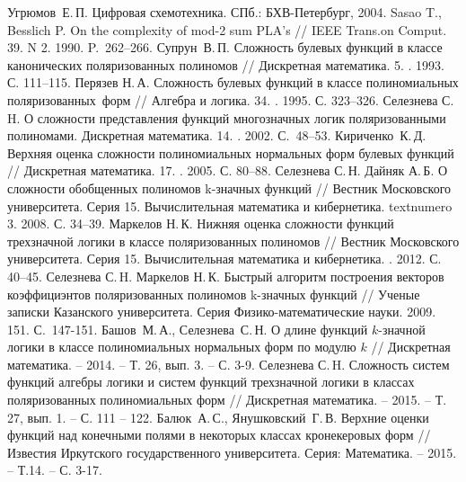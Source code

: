\documentclass [12pt, a4paper] {article}
\begin{document}
\begin{thebibliography}{0}
 Угрюмов~Е.\,П. Цифровая схемотехника. СПб.: БХВ-Петербург, 2004.
 Sasao T., Besslich P. On the complexity of mod-2 sum PLA’s  //
    IEEE Trans.on Comput. 39. N 2. 1990. P.~262--266.
 Супрун~В.\,П. Сложность булевых функций в классе канонических
    поляризованных полиномов // Дискретная математика. 5.
    . 1993. С. 111--115.
 Перязев Н.\,А. Сложность булевых функций в классе полиномиальных
    поляризованных~форм // Алгебра и логика. 34.
    . 1995. С. 323--326.
 Селезнева С.\,H. О сложности представления функций многозначных
    логик поляризованными полиномами. Дискретная
    математика. 14. . 2002. С.~48--53.
 Кириченко~К.\,Д. Верхняя оценка сложности полиномиальных
    нормальных форм булевых функций
    // Дискретная математика. 17. . 2005. С. 80--88.
 Селезнева С.\,Н. Дайняк А.\,Б. О сложности обобщенных
    полиномов k\nobreakdash-значных функций // Вестник Московского
    университета. Серия 15. Вычислительная математика и кибернетика. 
        textnumero 3. 2008. С. 34--39.
 Маркелов Н.\,К. Нижняя оценка сложности функций трехзначной
    логики в классе поляризованных полиномов // Вестник
    Московского университета. Серия 15. Вычислительная математика и
        кибернетика. . 2012. С. 40--45.
 Селезнева С.\,H. Маркелов Н.\,К. Быстрый алгоритм построения
    векторов коэффициэнтов поляризованных полиномов
    k-значных функций // Ученые записки Казанского университета. Серия
        Физико-математические науки. 2009. 151.
     С.~147-151.
 Башов~М.\,А., Селезнева~С.\,Н. О длине функций $k$-значной
    логики в классе полиномиальных нормальных
    форм по модулю $k$ // Дискретная математика. -- 2014. -- Т. 26,
        вып. 3. -- С. 3-9.
 Селезнева С.\,H. Сложность систем функций алгебры логики и
    систем функций трехзначной логики в классах
    поляризованных полиномиальных форм // Дискретная математика. -- 2015. --
        Т. 27, вып. 1. -- С. 111 -- 122. 
 Балюк~А.\,С., Янушковский~Г.\,В. Верхние оценки функций над
    конечными полями в некоторых классах
    кронекеровых форм // Известия Иркутского государственного университета.
        Серия: Математика. -- 2015. -- Т.14. -- С. 3-17.
\end{thebibliography}
\end{document}
